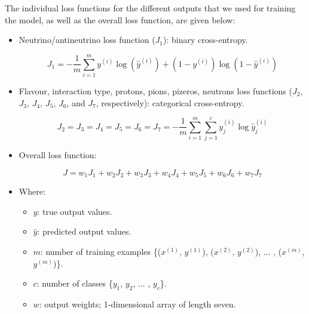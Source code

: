 The individual loss functions for the different outputs that we used for training the model, as well as the overall loss function, are given below:

\begin{itemize}
    \item Neutrino/antineutrino loss function ($J_{1}$): binary cross-entropy.

    \begin{equation}
    J_{1} = - \frac{1} m \sum_{i=1}^{m} y^{(i)} \log (\hat{y}^{(i)}) + (1 - y^{(i)}) \log (1 -\hat{y}^{(i)})
    \end{equation}

    \item Flavour, interaction type, protons, pions, pizeros, neutrons loss functions ($J_{2}$, $J_{3}$, $J_{4}$, $J_{5}$, $J_{6}$, and $J_{7}$, respectively): categorical cross-entropy.

    \begin{equation}
    J_{2} = J_{3} = J_{4} = J_{5} = J_{6} = J_{7} = - \frac{1} m \sum_{i=1}^{m} \sum_{j=1}^{c} y_{j}^{(i)} \log \hat{y}_{j}^{(i)}
    \end{equation}

    \item Overall loss function:

    \begin{equation}
    J = w_{1} J_{1} + w_{2} J_{2} + w_{3} J_{3} + w_{4} J_{4} + w_{5} J_{5} + w_{6} J_{6} + w_{7} J_{7}
    \end{equation}

    \item Where:
        \begin{itemize}
        \item $y$: true output values.
        \item $\hat{y}$: predicted output values.
        \item $m$: number of training examples \{($x^{(1)}$, $y^{(1)}$), ($x^{(2)}$, $y^{(2)}$), ... , ($x^{(m)}$, $y^{(m)}$)\}.
        \item $c$: number of classes \{$y_{1}$, $y_{2}$, ... , $y_{c}$\}.
        \item $w$: output weights; 1-dimensional array of length seven.
    \end{itemize}
\end{itemize}


